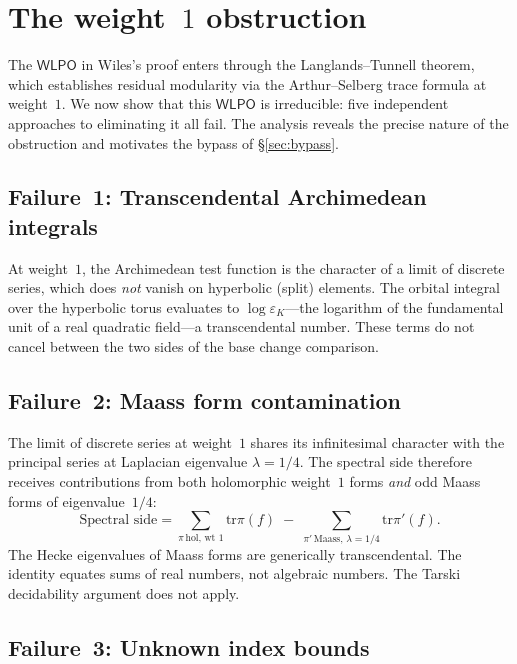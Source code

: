 \documentclass[11pt]{article}
\theoremstyle{plain}
\theoremstyle{definition}
\theoremstyle{remark}
\newcommand{\tr}{\mathrm{tr}}
\newcommand{\WLPO}{\mathsf{WLPO}}
\begin{document}
\section{The weight~$1$ obstruction}\label{sec:weight1}

The $\WLPO$ in Wiles's proof enters through the
Langlands--Tunnell theorem, which establishes residual
modularity via the Arthur--Selberg trace formula at weight~$1$.
We now show that this $\WLPO$ is irreducible: five
independent approaches to eliminating it all fail.  The
analysis reveals the precise nature of the obstruction and
motivates the bypass of \S\ref{sec:bypass}.

\subsection{Failure~1: Transcendental Archimedean integrals}

At weight~$1$, the Archimedean test function is the character of
a limit of discrete series, which does \emph{not} vanish on
hyperbolic (split) elements.  The orbital integral over the
hyperbolic torus evaluates to $\log \varepsilon_K$---the logarithm
of the fundamental unit of a real quadratic field---a
transcendental number.  These terms do not cancel between the
two sides of the base change comparison.

\subsection{Failure~2: Maass form contamination}

The limit of discrete series at weight~$1$ shares its
infinitesimal character with the principal series at Laplacian
eigenvalue $\lambda = 1/4$.  The spectral side therefore receives
contributions from both holomorphic weight~$1$ forms \emph{and}
odd Maass forms of eigenvalue~$1/4$:
\[
  \text{Spectral side} = \sum_{\pi \,\text{hol, wt 1}}
  \tr \pi(f) \;-\; \sum_{\pi' \,\text{Maass, }\lambda = 1/4}
  \tr \pi'(f).
\]
The Hecke eigenvalues of Maass forms are generically
transcendental.  The identity equates sums of real numbers,
not algebraic numbers.  The Tarski decidability argument does
not apply.

\subsection{Failure~3: Unknown index bounds}
\end{document}
